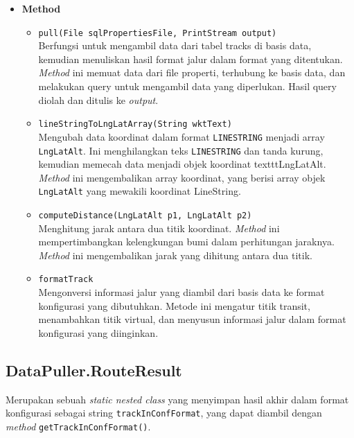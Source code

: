 \begin{itemize}
    \item \textbf{Method}
    \begin{itemize}
        \item \texttt{pull(File sqlPropertiesFile, PrintStream output)}
        \\ Berfungsi untuk mengambil data dari tabel tracks di basis data, kemudian menuliskan hasil format jalur dalam format yang ditentukan. \textit{Method} ini memuat data dari file properti, terhubung ke basis data, dan melakukan query untuk mengambil data yang diperlukan. Hasil query diolah dan ditulis ke \textit{output}.
        \item \texttt{lineStringToLngLatArray(String wktText)}
        \\ Mengubah data koordinat dalam format \texttt{LINESTRING} menjadi array \texttt{LngLatAlt}. Ini menghilangkan teks \texttt{LINESTRING} dan tanda kurung, kemudian memecah data menjadi objek koordinat texttt{LngLatAlt}. \textit{Method} ini mengembalikan array koordinat, yang berisi array objek \texttt{LngLatAlt} yang mewakili koordinat LineString.
        \item \texttt{computeDistance(LngLatAlt p1, LngLatAlt p2)}
         \\ Menghitung jarak antara dua titik koordinat. \textit{Method} ini mempertimbangkan kelengkungan bumi dalam perhitungan jaraknya. \textit{Method} ini mengembalikan jarak yang dihitung antara dua titik.
         \newpage
         \item \texttt{formatTrack}
         \\ Mengonversi informasi jalur yang diambil dari basis data ke format konfigurasi yang dibutuhkan. Metode ini mengatur titik transit, menambahkan titik virtual, dan menyusun informasi jalur dalam format konfigurasi yang diinginkan.
    \end{itemize}
\end{itemize}
\subsection{DataPuller.RouteResult}
Merupakan sebuah \textit{static nested class} yang menyimpan hasil akhir dalam format konfigurasi sebagai string \texttt{trackInConfFormat}, yang dapat diambil dengan \textit{method} \texttt{getTrackInConfFormat()}.

